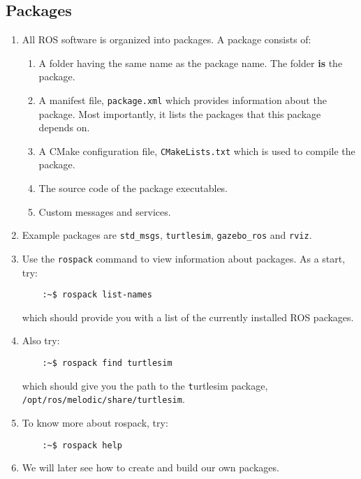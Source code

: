 \documentclass{article}
\begin{document}
        \subsection{Packages}
            \begin{enumerate}
                \item All ROS software is organized into packages. A package consists of:
                \begin{enumerate}
                    \item A folder having the same name as the package name. The folder \textbf{is} the package.
                    \item A manifest file, \texttt{package.xml} which provides information about the package. Most importantly, it lists the packages
                    that this package depends on.
                    \item A CMake configuration file, \texttt{CMakeLists.txt} which is used to compile the package.
                    \item The source code of the package executables.
                    \item Custom messages and services. 
                \end{enumerate}

                \item Example packages are \texttt{std\_msgs}, \texttt{turtlesim}, \texttt{gazebo\_ros} and \texttt{rviz}.
                \item Use the \texttt{rospack} command to view information about packages. As a start, try:
                \begin{verbatim}
    :~$ rospack list-names
                \end{verbatim}
                which should provide you with a list of the currently installed ROS packages.
                \item Also try:
                \begin{verbatim}
    :~$ rospack find turtlesim
                \end{verbatim}
                which should give you the path to the {\texttt turtlesim} package, \texttt{/opt/ros/melodic/share/turtlesim}.
                \item To know more about rospack, try:
                \begin{verbatim}
    :~$ rospack help
                \end{verbatim}
                \item We will later see how to create and build our own packages.
            \end{enumerate}
\end{document}
